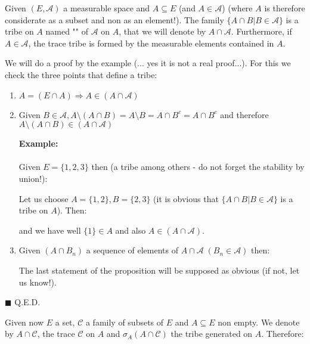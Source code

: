 	\begin{theorem}
	Given $(E, \mathcal{A})$ a measurable space and $A\subseteq E$ (and $A\in \mathcal{A}$) (where $A$ is therefore considerate as a subset and non as an element!). The family $\{A\cap B| B\in \mathcal{A}\}$ is a tribe on $A$ named "" of $\mathcal{A}$ on $A$, that we will denote by $A\cap \mathcal{A}$. Furthermore, if $A\in \mathcal{A}$, the trace tribe is formed by the measurable elements contained in $A$.
	\end{theorem}
	\begin{dem}
	We will do a proof by the example (... yes it is not a real proof...). For this we check the three points that define a tribe:
	\begin{enumerate}
		\item $A=(E\cap A) \Rightarrow A\in (A\cap \mathcal{A})$
		
		\item Given $B\in\mathcal{A},A \setminus (A\cap B)=A\setminus B=A \cap B^c=A \cap B^c$ and therefore $A\setminus (A\cap B)\in (A\cap \mathcal{A})$
		\begin{tcolorbox}[colframe=black,colback=white,sharp corners]
		\textbf{{\Large {}}Example:}\\\\
		Given $E=\{1,2,3\}$ then (a tribe among others - do not forget the stability by union!):
		
		Let us choose $A=\{1,2\},B=\{2,3\}$ (it is obvious that $\{A\cap B|B\in \mathcal{A}\}$ is a tribe on $A$). Then:
		
		and we have well $\{1\}\in A$ and also $A\in (A\cap \mathcal{A})$.
		\end{tcolorbox}
		
		\item Given $(A\cap B_n)$ a sequence of elements of $A\cap \mathcal{A}\; (B_n\in \mathcal{A})$ then:
		
		The last statement of the proposition will be supposed as obvious (if not, let us know!).
	\end{enumerate}
	\begin{flushright}
		$\blacksquare$  Q.E.D.
	\end{flushright}
	\end{dem}
	Given now $E$ a set, $\mathcal{C}$ a family of subsets of $E$ and $A\subseteq E$ non empty. We denote by $A\cap \mathcal{C}$, the trace $\mathcal{C}$ on $A$ and $\sigma_A(A\cap \mathcal{C})$ the tribe generated on $A$. Therefore:
	

